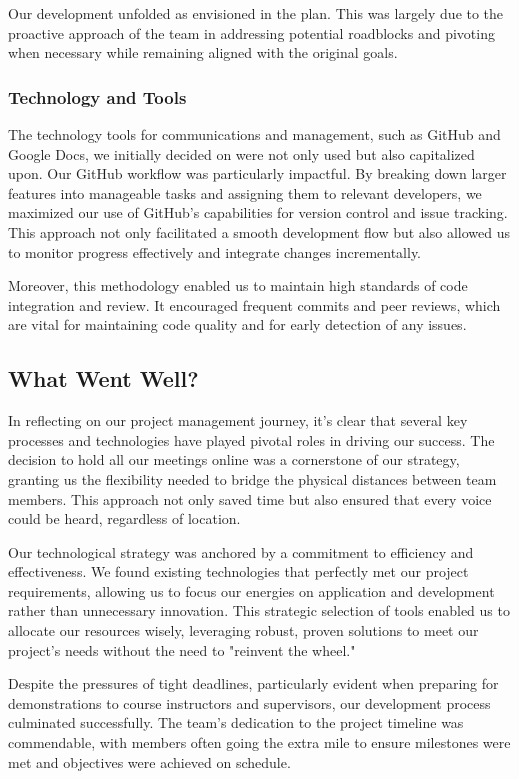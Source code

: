 \documentclass{article}
\begin{document}
Our development unfolded as envisioned in the plan. This was largely due to the proactive approach of the team in addressing potential roadblocks and pivoting when necessary while remaining aligned with the original goals.
\subsubsection{Technology and Tools}
The technology tools for communications and management, such as GitHub and Google Docs, we initially decided on were not only used but also capitalized upon. Our GitHub workflow was particularly impactful. By breaking down larger features into manageable tasks and assigning them to relevant developers, we maximized our use of GitHub's capabilities for version control and issue tracking. This approach not only facilitated a smooth development flow but also allowed us to monitor progress effectively and integrate changes incrementally.

Moreover, this methodology enabled us to maintain high standards of code integration and review. It encouraged frequent commits and peer reviews, which are vital for maintaining code quality and for early detection of any issues.

\subsection{What Went Well?}
In reflecting on our project management journey, it's clear that several key processes and technologies have played pivotal roles in driving our success. The decision to hold all our meetings online was a cornerstone of our strategy, granting us the flexibility needed to bridge the physical distances between team members. This approach not only saved time but also ensured that every voice could be heard, regardless of location.

Our technological strategy was anchored by a commitment to efficiency and effectiveness. We found existing technologies that perfectly met our project requirements, allowing us to focus our energies on application and development rather than unnecessary innovation. This strategic selection of tools enabled us to allocate our resources wisely, leveraging robust, proven solutions to meet our project's needs without the need to "reinvent the wheel."

Despite the pressures of tight deadlines, particularly evident when preparing for demonstrations to course instructors and supervisors, our development process culminated successfully. The team's dedication to the project timeline was commendable, with members often going the extra mile to ensure milestones were met and objectives were achieved on schedule.
\end{document}
